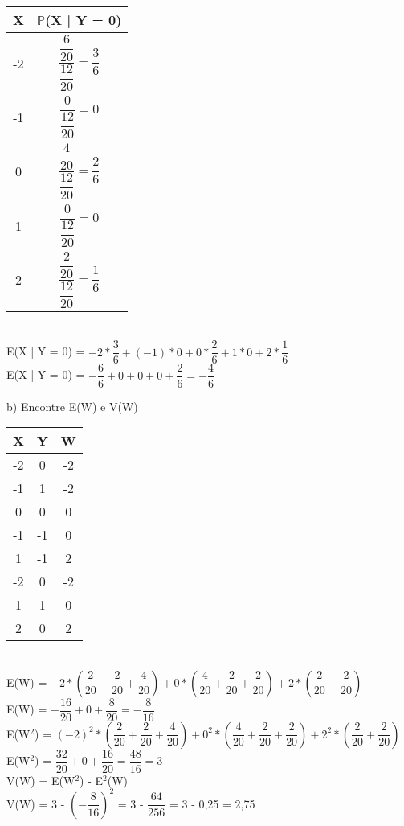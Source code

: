 \documentclass[12pt,a4paper]{article}
\begin{document}
\begin{center}
\begin{tabular}{cc}
			X & $\mathbb{P}$(X | Y = 0)\\ \midrule
			-2 & $\dfrac{\dfrac{6}{20}}{\dfrac{12}{20}} = \dfrac{3}{6}$\\ \midrule
			-1 & $\dfrac{0}{\dfrac{12}{20}} = 0$\\ \midrule
			0 & $\dfrac{\dfrac{4}{20}}{\dfrac{12}{20}} = \dfrac{2}{6}$\\ \midrule
			1 & $\dfrac{0}{\dfrac{12}{20}} = 0$\\ \midrule
			2 & $\dfrac{\dfrac{2}{20}}{\dfrac{12}{20}} = \dfrac{1}{6}$\\ \midrule
		\end{tabular}
		\vspace{1cm}\\
		E(X | Y = 0) = $ -2 * \dfrac{3}{6} + (-1) * 0 + 0 * \dfrac{2}{6} + 1 * 0 + 2 * \dfrac{1}{6}$
		\vspace{0.25cm}\\
		E(X | Y = 0) = $-\dfrac{6}{6} + 0 + 0 + 0 + \dfrac{2}{6} = -\dfrac{4}{6}$
	\end{center}
	\vspace{1cm}
	b) Encontre E(W) e V(W)
	\begin{center}
		\begin{tabular}{ccc}
			X & Y & W\\ \midrule
			-2 & 0 & -2\\ \midrule
			-1 & 1 & -2\\ \midrule
			0 & 0 & 0\\ \midrule
			-1 & -1 & 0\\ \midrule
			1 & -1 & 2\\ \midrule
			-2 & 0 & -2\\ \midrule
			1 & 1 & 0\\ \midrule
			2 & 0 & 2\\ \midrule
		\end{tabular}
	\vspace{1cm}\\
	E(W) = $-2 * (\dfrac{2}{20} + \dfrac{2}{20} + \dfrac{4}{20}) + 0 * (\dfrac{4}{20} + \dfrac{2}{20} + \dfrac{2}{20}) + 2 * (\dfrac{2}{20} + \dfrac{2}{20})$
	\vspace{0.25cm}\\
	E(W) = $-\dfrac{16}{20} + 0 + \dfrac{8}{20} = -\dfrac{8}{16}$
	\vspace{1cm}\\
	E(W$^2$) = $(-2)^2 * (\dfrac{2}{20} + \dfrac{2}{20} + \dfrac{4}{20}) + 0^2 * (\dfrac{4}{20} + \dfrac{2}{20} + \dfrac{2}{20}) + 2^2 * (\dfrac{2}{20} + \dfrac{2}{20})$
	\vspace{0.25cm}\\
	E(W$^2$) = $\dfrac{32}{20} + 0 + \dfrac{16}{20} = \dfrac{48}{16} = 3$
	\vspace{1cm}\\
	V(W) = E(W$^2$) - E$^2$(W)
	\vspace{0.25cm}\\
	V(W) = 3 - $\left(-\dfrac{8}{16}\right)^2$ = 3 - $\dfrac{64}{256}$ = 3 - 0,25 = 2,75 
	\end{center}
\end{document}
